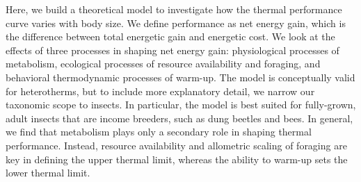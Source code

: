 Here, we build a theoretical model to investigate how the thermal performance curve varies with body size.
We define performance as net energy gain, which is the difference between total energetic gain and energetic cost.
We look at the effects of three processes in shaping net energy gain: physiological processes of metabolism, ecological processes of resource availability and foraging, and behavioral thermodynamic processes of warm-up.
The model is conceptually valid for heterotherms, but to include more explanatory detail, we narrow our taxonomic scope to insects.
In particular, the model is best suited for fully-grown, adult insects that are income breeders, such as dung beetles and bees.
In general, we find that metabolism plays only a secondary role in shaping thermal performance.
Instead, resource availability and allometric scaling of foraging are key in defining the upper thermal limit, whereas the ability to warm-up sets the lower thermal limit.
